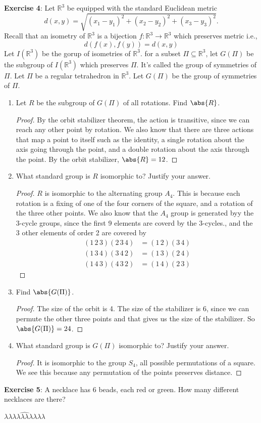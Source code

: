 \documentclass{article}
\begin{document}
\textbf{Exercise 4}: Let $\mathbb{R}^{3}$ be equipped with the standard Euclidean metric
\begin{equation*}
	d(x,y) = \sqrt{(x_{1} - y_{1})^{2} + (x_{2} - y_{2})^{2} + (x_{3} - y_{3})^{2}}.
\end{equation*}
Recall that an isometry of $\mathbb{R}^{3}$ is a bijection $f: \mathbb{R}^{3} \rightarrow \mathbb{R}^{3}$ which preserves metric i.e., 
\begin{equation*}
	d(f(x), f(y)) = d(x, y)
\end{equation*}
Let $I(\mathbb{R}^{3})$ be the gorup of isometries of $\mathbb{R}^{3}$. for a subset $\Pi \subseteq \mathbb{R}^{3}$, let $G(\Pi)$ be the subgroup of $I(\mathbb{R}^{3})$ which preserves $\Pi$. It's called the group of symmetries of $\Pi$. Let $\Pi$ be a regular tetrahedron in $\mathbb{R}^{3}$. Let $G(\Pi)$ be the group of symmetries of $\Pi$.
\begin{enumerate}
	\item Let $R$ be the subgroup of $G(\Pi)$ of all rotations. Find $\abs{R}$.
		\begin{proof}
			By the orbit stabilizer theorem, the action is transitive, since we can reach any other point by rotation. We also know that there are three actions that map a point to itself such as the identity, a single rotation about the axis going through the point, and a double rotation about the axis through the point. By the orbit stabilizer, $\abs{R} = 12$.
		\end{proof}

	\item What standard group is $R$ isomorphic to? Justify your answer.
		\begin{proof}
			$R$ is isomorphic to the alternating group $A_{4}$. This is because each rotation is a fixing of one of the four corners of the square, and a rotation of the three other points. We also know that the $A_{4}$ group is generated byy the $3$-cycle groups, since the first 9 elements are coverd by the $3$-cycles., and the 3 other elements of order 2 are covered by 
			\begin{align*}
				(1 \, 2 \, 3)(2 \, 3 \, 4) &= (1 \, 2)(3 \, 4) \\
				(1 \, 3 \, 4)(3 \, 4 \, 2) &= (1 \, 3)(2 \, 4) \\
				(1 \, 4 \, 3)(4 \, 3 \, 2) &= (1 \, 4)(2 \, 3) 
			\end{align*}
		\end{proof}

	\item Find $\abs{G(\Pi)}$. 
		\begin{proof}
			The size of the orbit is 4. The size of the stabilizer is 6, since we can permute the other three points and that gives us the size of the stabilizer. So $\abs{G(\Pi)} = 24$.
		\end{proof}
	
	\item What standard group is $G(\Pi)$ isomorphic to? Justify your answer.
		\begin{proof}
			 It is isomorphic to the group $S_{4}$, all possible permutations of a square. We see this because any permutation of the points preserves distance.
		\end{proof}
\end{enumerate}
\textbf{Exercise 5}: A necklace has 6 beads, each red or green. How many different necklaces are there?

$\hat{\lambda\lambda\lambda\lambda\lambda\lambda\lambda\lambda\lambda\lambda} 
$
\end{document}
